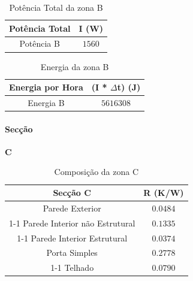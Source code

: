 \documentclass[12pt, a4paper]{article}
\begin{document}
\vspace{35mm}

\begin{table}[htpb]
	\begin{center}
		\begin{tabular}{c c}
			\toprule
			Potência  Total 										 & 	I (W) \\
			\midrule
			 Potência B		               	     & $1560$	 \\
			\bottomrule
		\end{tabular}
	\end{center}
	\caption{Potência Total da zona B}\label{tab:seccaoBpotT}
\end{table}

\vspace{35mm}

\begin{table}[htpb]
	\begin{center}
		\begin{tabular}{c c}
			\toprule
			Energia por Hora 								 & 	(I * $\Delta$t) (J) \\
			\midrule
			Energia B 						               	     & $5616308$	 \\
			\bottomrule
		\end{tabular}
	\end{center}
	\caption{Energia da zona B}\label{tab:seccaoBenergia}
\end{table}

\pagebreak
\paragraph{Secção}
\textbf{C}

\begin{table}[htpb]
	\begin{center}
		\begin{tabular}{c c}
			\toprule
			Secção C   													 & 	R (K/W) \\
			\midrule
			Parede Exterior  		               				     & $0.0484$		 \\
			\cline{1-1}
			\multirow{1}{*}{2x  }
			Parede Interior n\~ao Estrutural          		 & $0.1335$		 \\
			\cline{1-1}
			Parede Interior Estrutural             	   		 & $0.0374$		 \\
			Porta Simples                 							 & $0.2778$		 \\
			\cline{1-1}
			Telhado                   									 & $0.0790$		 \\
			\bottomrule
		\end{tabular}
	\end{center}
	\caption{Composição da zona C}\label{tab:seccaoC}
\end{table}
\end{document}
